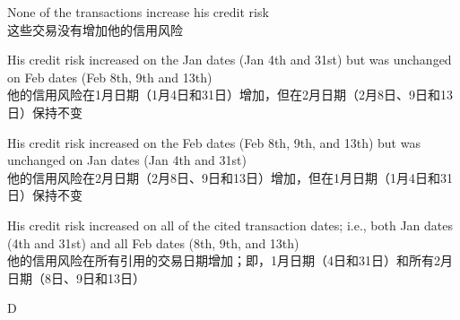 \documentclass{article}
\begin{document}
  \begin{choices}
      \item None of the transactions increase his credit risk\\
      这些交易没有增加他的信用风险
      \item His credit risk increased on the Jan dates (Jan 4th and 31st) but was unchanged on Feb dates (Feb 8th, 9th and 13th)\\
      他的信用风险在1月日期（1月4日和31日）增加，但在2月日期（2月8日、9日和13日）保持不变
      \item His credit risk increased on the Feb dates (Feb 8th, 9th, and 13th) but was unchanged on Jan dates (Jan 4th and 31st)\\
      他的信用风险在2月日期（2月8日、9日和13日）增加，但在1月日期（1月4日和31日）保持不变
      \item His credit risk increased on all of the cited transaction dates; i.e., both Jan dates (4th and 31st) and all Feb dates (8th, 9th, and 13th)\\
      他的信用风险在所有引用的交易日期增加；即，1月日期（4日和31日）和所有2月日期（8日、9日和13日）
  \end{choices}
  
  \begin{correctanswer}
  D
  \end{correctanswer}
  
\end{document}
